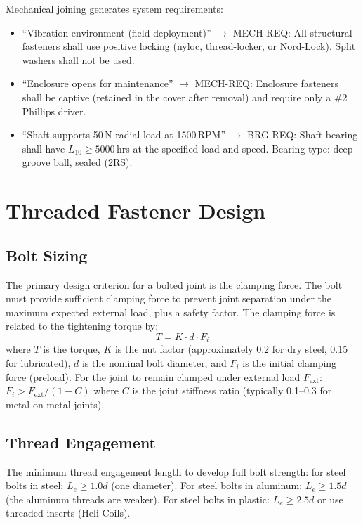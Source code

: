 \begin{keyconceptbox}
Mechanical joining generates system requirements:
\begin{itemize}[nosep,leftmargin=1.5em]
\item ``Vibration environment (field deployment)'' $\to$ MECH-REQ: All structural fasteners shall use positive locking (nyloc, thread-locker, or Nord-Lock). Split washers shall not be used.
\item ``Enclosure opens for maintenance'' $\to$ MECH-REQ: Enclosure fasteners shall be captive (retained in the cover after removal) and require only a \#2 Phillips driver.
\item ``Shaft supports 50\,N radial load at 1500\,RPM'' $\to$ BRG-REQ: Shaft bearing shall have $L_{10} \geq 5000$\,hrs at the specified load and speed. Bearing type: deep-groove ball, sealed (2RS).
\end{itemize}
\end{keyconceptbox}

\section{Threaded Fastener Design}
\subsection{Bolt Sizing}
The primary design criterion for a bolted joint is the clamping force. The bolt must provide sufficient clamping force to prevent joint separation under the maximum expected external load, plus a safety factor. The clamping force is related to the tightening torque by:
\begin{equation}
T = K \cdot d \cdot F_i
\end{equation}
where $T$ is the torque, $K$ is the nut factor (approximately 0.2 for dry steel, 0.15 for lubricated), $d$ is the nominal bolt diameter, and $F_i$ is the initial clamping force (preload). For the joint to remain clamped under external load $F_{\text{ext}}$: $F_i > F_{\text{ext}} / (1 - C)$ where $C$ is the joint stiffness ratio (typically 0.1--0.3 for metal-on-metal joints).

\subsection{Thread Engagement}
The minimum thread engagement length to develop full bolt strength: for steel bolts in steel: $L_e \geq 1.0d$ (one diameter). For steel bolts in aluminum: $L_e \geq 1.5d$ (the aluminum threads are weaker). For steel bolts in plastic: $L_e \geq 2.5d$ or use threaded inserts (Heli-Coils).

